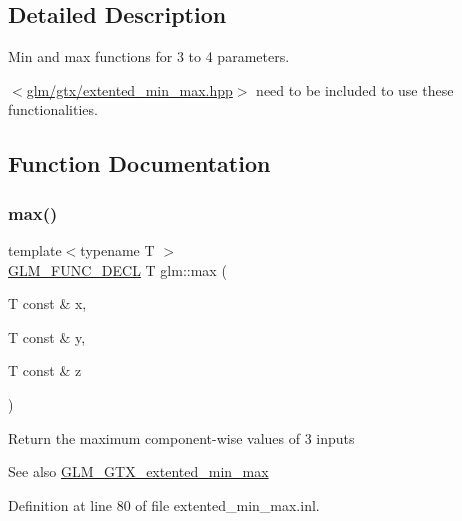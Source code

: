 \subsection{Detailed Description}
Min and max functions for 3 to 4 parameters.

$<$\hyperlink{extented__min__max_8hpp}{glm/gtx/extented\+\_\+min\+\_\+max.\+hpp}$>$ need to be included to use these functionalities. 

\subsection{Function Documentation}
\mbox{\label{group__gtx__extented__min__max_ga04991ccb9865c4c4e58488cfb209ce69}} 
\subsubsection{\texorpdfstring{max()}{max()}\hspace{0.1cm}{\footnotesize\ttfamily [1/6]}}
{\footnotesize\ttfamily template$<$typename T $>$ \\
\hyperlink{setup_8hpp_ab2d052de21a70539923e9bcbf6e83a51}{G\+L\+M\+\_\+\+F\+U\+N\+C\+\_\+\+D\+E\+CL} T glm\+::max (\begin{DoxyParamCaption}\item[{T const \&}]{x,  }\item[{T const \&}]{y,  }\item[{T const \&}]{z }\end{DoxyParamCaption})}

Return the maximum component-\/wise values of 3 inputs \begin{DoxySeeAlso}{See also}
\hyperlink{group__gtx__extented__min__max}{G\+L\+M\+\_\+\+G\+T\+X\+\_\+extented\+\_\+min\+\_\+max} 
\end{DoxySeeAlso}


Definition at line 80 of file extented\+\_\+min\+\_\+max.\+inl.

\mbox{\label{group__gtx__extented__min__max_gae1b7bbe5c91de4924835ea3e14530744}} 
